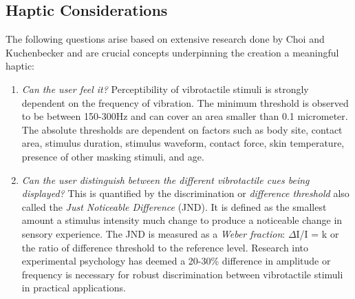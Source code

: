\subsection{Haptic Considerations} \label{hapticConsiderations}
The following questions arise based on extensive research done by Choi and Kuchenbecker \cite{choi2013vibrotactile} and are crucial concepts underpinning the creation a meaningful haptic:
\begin{enumerate}
    \item \emph{Can the user feel it?}
Perceptibility of vibrotactile stimuli is strongly dependent on the frequency of vibration. The minimum threshold is observed to be between 150-300Hz and can cover an area smaller than 0.1 micrometer. The absolute thresholds are dependent on factors such as body site, contact area, stimulus duration, stimulus waveform, contact force, skin temperature, presence of other masking stimuli, and age.

    \item \emph{Can the user distinguish between the different vibrotactile cues being displayed?}
This is quantified by the discrimination or \textit{difference threshold} also called the \textit{Just Noticeable Difference} (JND). It is defined as the smallest amount a stimulus intensity much change to produce a noticeable change in sensory experience. The JND is measured as a \textit{Weber fraction}:
${\Delta}$I/I = k or the ratio of difference threshold to the reference level.
Research into experimental psychology has deemed a 20-30\% difference in amplitude or frequency is necessary for robust discrimination between vibrotactile stimuli in practical applications.


\end{enumerate}
